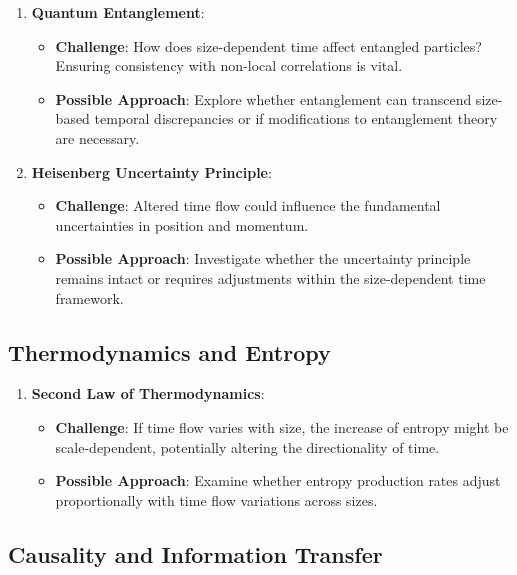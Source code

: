 \documentclass[12pt]{article}
\begin{document}
\begin{enumerate}
    \item \textbf{Quantum Entanglement}:
    \begin{itemize}
        \item \textbf{Challenge}: How does size-dependent time affect entangled particles? Ensuring consistency with non-local correlations is vital.
        \item \textbf{Possible Approach}: Explore whether entanglement can transcend size-based temporal discrepancies or if modifications to entanglement theory are necessary.
    \end{itemize}
    
    \item \textbf{Heisenberg Uncertainty Principle}:
    \begin{itemize}
        \item \textbf{Challenge}: Altered time flow could influence the fundamental uncertainties in position and momentum.
        \item \textbf{Possible Approach}: Investigate whether the uncertainty principle remains intact or requires adjustments within the size-dependent time framework.
    \end{itemize}
\end{enumerate}

\subsection{Thermodynamics and Entropy}

\begin{enumerate}
    \item \textbf{Second Law of Thermodynamics}:
    \begin{itemize}
        \item \textbf{Challenge}: If time flow varies with size, the increase of entropy might be scale-dependent, potentially altering the directionality of time.
        \item \textbf{Possible Approach}: Examine whether entropy production rates adjust proportionally with time flow variations across sizes.
    \end{itemize}
\end{enumerate}

\subsection{Causality and Information Transfer}
\end{document}
